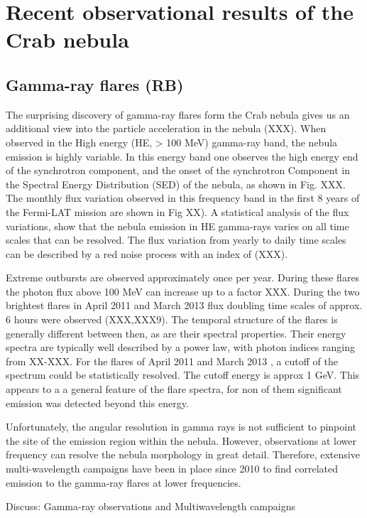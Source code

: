\section{Recent observational results of the Crab nebula}
\subsection{Gamma-ray flares (RB)}

The surprising discovery of gamma-ray flares form the Crab nebula gives us an additional view into the particle acceleration in the nebula (XXX). When observed in the High energy (HE, > 100 MeV) gamma-ray band, the nebula emission is highly variable. In this energy band one observes the high energy end of the synchrotron component, and the onset of the synchrotron Component in the Spectral Energy Distribution (SED) of the nebula, as shown in Fig. XXX. The monthly flux variation observed in this frequency band in the first 8 years of the Fermi-LAT mission are shown in Fig XX). A statistical analysis of the flux variations, show that the nebula emission in HE gamma-rays varies on all time scales that can be resolved. The flux variation from yearly to daily time scales can be described by a red noise process with an index of (XXX).

Extreme outbursts are observed approximately once per year. During these flares the photon flux above 100 MeV can increase up to a factor XXX. During the two brightest flares in April 2011 and March 2013 flux doubling time scales of approx. 6 hours were observed (XXX,XXX9). The temporal structure of the flares is generally different between then, as are their spectral properties. Their energy spectra are typically well described by a power law, with photon indices ranging from XX-XXX. For the flares of April 2011 and March 2013 , a cutoff of the spectrum could be statistically resolved. The cutoff energy is approx 1 GeV. This appears to a a general feature of the flare spectra, for non of them significant emission was detected beyond this energy.

Unfortunately, the angular resolution in gamma rays is not sufficient to pinpoint the site of the emission region within the nebula. However, observations at lower frequency can resolve the nebula morphology in great detail. Therefore, extensive multi-wavelength campaigns have been in place since 2010 to find correlated emission to the gamma-ray flares at lower frequencies. 

Discuss: Gamma-ray observations and Multiwavelength campaigns

